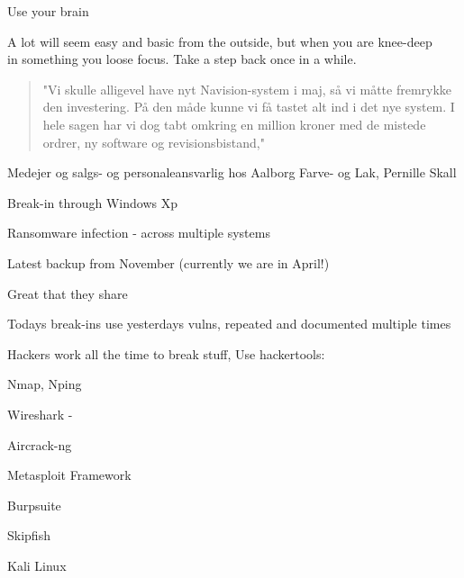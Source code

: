 \documentclass[20pt,landscape,a4paper,footrule]{foils}
\begin{document}
\centerline{Use your brain}

A lot will seem easy and basic from the outside, but when you are knee-deep\\
in something you loose focus. Take a step back once in a while.


\begin{quote}
"Vi skulle alligevel have nyt Navision-system i maj, så vi måtte fremrykke den investering. På den måde kunne vi få tastet alt ind i det nye system. I hele sagen har vi dog tabt omkring en million kroner med de mistede ordrer, ny software og revisionsbistand,"
\end{quote}
Medejer og salgs- og personaleansvarlig hos Aalborg Farve- og Lak, Pernille Skall

\begin{list1}
\item Break-in through Windows Xp
\item Ransomware infection - across multiple systems
\item Latest backup from November (currently we are in April!)
\item Great that they share
\item Todays break-ins use yesterdays vulns, repeated and documented multiple times
\end{list1}


{\small{}}




\begin{list2}
\item Hackers work all the time to break stuff, Use hackertools:
\item Nmap, Nping 
\item Wireshark - 
\item Aircrack-ng 
\item Metasploit Framework 
\item Burpsuite 
\item Skipfish 
\item Kali Linux 
\end{list2}
\end{document}
